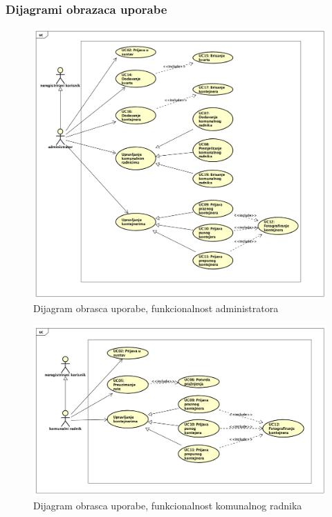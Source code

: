 				
				
				
				
				
					
				\subsubsection{Dijagrami obrazaca uporabe}
					
					
					
						
				\begin{figure}[H]
					\includegraphics[scale=0.5]{figures/pravi_UC_za_administratora.PNG}
					\centering
					\caption{Dijagram obrasca uporabe, funkcionalnost administratora}
					\label{fig:ucad-diag}
				\end{figure}
			
				\begin{figure}[H]
					\includegraphics[scale=0.4]{figures/pravi_UC_za_smetlara.PNG}
					\centering
					\caption{Dijagram obrasca uporabe, funkcionalnost komunalnog radnika}
					\label{fig:ucad-diag}
				\end{figure}
			
